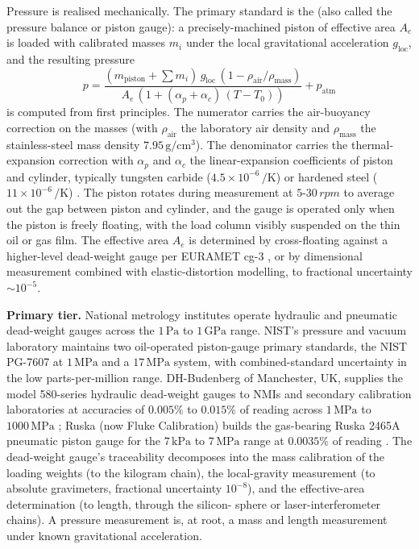 Pressure is realised mechanically. The primary standard is the
 (also called the pressure balance or
piston gauge): a precisely-machined piston of effective area $A_{e}$
is loaded with calibrated masses $m_{i}$ under the local
gravitational acceleration $g_{\text{loc}}$, and the resulting
pressure
\[
p = \frac{(m_{\text{piston}} + \sum m_{i})\, g_{\text{loc}}\,
(1 - \rho_{\text{air}}/\rho_{\text{mass}})}
{A_{e}\,(1 + (\alpha_{p} + \alpha_{c})\,(T - T_{0}))}
+ p_{\text{atm}}
\]
is computed from first principles. The numerator carries the
air-buoyancy correction on the masses (with $\rho_{\text{air}}$ the
laboratory air density and $\rho_{\text{mass}}$ the stainless-steel
mass density $7.95\,\si{\gram\per\centi\meter\cubed}$). The
denominator carries the thermal-expansion correction with
$\alpha_{p}$ and $\alpha_{c}$ the linear-expansion coefficients of
piston and cylinder, typically tungsten carbide
($4.5 \times 10^{-6}\,\si{\per\kelvin}$) or hardened steel
($11 \times 10^{-6}\,\si{\per\kelvin}$) \cite{std:ch03t3b-oiml-r110-2007}.
The piston rotates during measurement at $5$-$30\,\si{rpm}$ to
average out the gap between piston and cylinder, and the gauge is
operated only when the piston is freely floating, with the load
column visibly suspended on the thin oil or gas film. The
effective area $A_{e}$ is determined by cross-floating against a
higher-level dead-weight gauge per EURAMET cg-3
\cite{std:ch03t3b-euramet-cg-3}, or by dimensional measurement
combined with elastic-distortion modelling, to fractional
uncertainty $\sim 10^{-5}$.

\textbf{Primary tier.} National metrology institutes operate
hydraulic and pneumatic dead-weight gauges across the
$1\,\si{\pascal}$ to $1\,\si{\giga\pascal}$ range. NIST's pressure
and vacuum laboratory \cite{web:ch03t3b-nist-pressure} maintains
two oil-operated piston-gauge primary standards, the NIST PG-7607
at $1\,\si{\mega\pascal}$ and a $17\,\si{\mega\pascal}$ system, with
combined-standard uncertainty in the low parts-per-million range.
DH-Budenberg of Manchester, UK, supplies the model 580-series
hydraulic dead-weight gauges to NMIs and secondary calibration
laboratories at accuracies of $0.005\%$ to $0.015\%$ of reading
across $1\,\si{\mega\pascal}$ to $1000\,\si{\mega\pascal}$
\cite{web:ch03t3b-dh-budenberg}; Ruska (now Fluke Calibration) builds
the gas-bearing Ruska 2465A pneumatic piston gauge for the
$7\,\si{\kilo\pascal}$ to $7\,\si{\mega\pascal}$ range at $0.0035\%$
of reading \cite{web:ch03t3b-ruska-2465}. The dead-weight gauge's
traceability decomposes into the mass calibration of the loading
weights (to the kilogram chain), the local-gravity measurement
(to absolute gravimeters, fractional uncertainty $10^{-8}$), and
the effective-area determination (to length, through the silicon-
sphere or laser-interferometer chains). A pressure measurement
is, at root, a mass and length measurement under known
gravitational acceleration.

